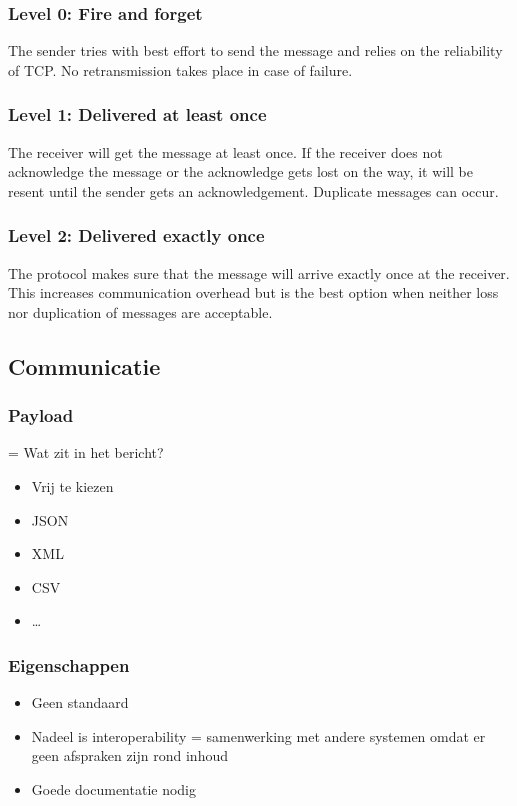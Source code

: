 \documentclass{article}
\begin{document}
\subsubsection{Level 0: Fire and forget}

The sender tries with best effort to send the message and relies
on the reliability of TCP. No retransmission takes place in case of failure.

\subsubsection{Level 1: Delivered at least once}

The receiver will get the message at least once. If the receiver
does not acknowledge the message or the acknowledge gets lost on the way, it will be
resent until the sender gets an acknowledgement. Duplicate messages can occur.

\subsubsection{Level 2: Delivered exactly once}

The protocol makes sure that the message will arrive exactly once
at the receiver. This increases communication overhead but is the best option when
neither loss nor duplication of messages are acceptable.

\subsection{Communicatie}

\subsubsection{Payload}
= Wat zit in het bericht?

\begin{itemize}
    \item Vrij te kiezen
    \item JSON
    \item XML
    \item CSV
    \item \dots
\end{itemize}

\subsubsection{Eigenschappen}

\begin{itemize}
    \item Geen standaard
    \item Nadeel is interoperability = samenwerking met andere systemen omdat er geen afspraken zijn rond inhoud
    \item Goede documentatie nodig
\end{itemize}
\end{document}
